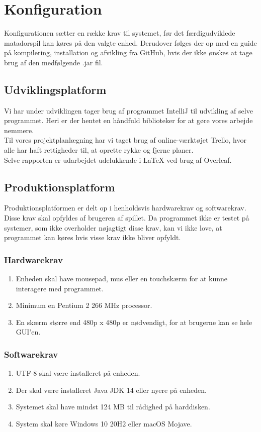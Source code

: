 \section{Konfiguration}
Konfigurationen sætter en række krav til systemet, før det færdigudviklede matadorspil kan køres på den valgte enhed. Derudover følges der op med en guide på kompilering, installation og afvikling fra GitHub, hvis der ikke ønskes at tage brug af den medfølgende .jar fil.

\subsection{Udviklingsplatform}
Vi har under udviklingen tager brug af programmet IntelliJ til udvikling af selve programmet. Heri er der hentet en håndfuld biblioteker for at gøre vores arbejde nemmere.\\
Til vores projektplanlægning har vi taget brug af online-værktøjet Trello, hvor alle har haft rettigheder til, at oprette rykke og fjerne planer.\\
Selve rapporten er udarbejdet udelukkende i LaTeX ved brug af Overleaf.

\subsection{Produktionsplatform}
Produktionsplatformen er delt op i henholdsvis hardwarekrav og softwarekrav. Disse krav skal opfyldes af brugeren af spillet. Da programmet ikke er testet på systemer, som ikke overholder nøjagtigt disse krav, kan vi ikke love, at programmet kan køres hvis visse krav ikke bliver opfyldt.
\subsubsection{Hardwarekrav}
\begin{enumerate}
\item Enheden skal have mousepad, mus eller en touchskærm for at kunne interagere med programmet.
\item Minimum en Pentium 2 266 MHz processor.
\item En skærm større end 480p x 480p er nødvendigt, for at brugerne kan se hele GUI'en.
\end{enumerate}


\subsubsection{Softwarekrav}
\begin{enumerate}
\item UTF-8 skal være installeret på enheden.
\item Der skal være installeret Java JDK 14 eller nyere på enheden.
\item Systemet skal have mindst 124 MB til rådighed på harddisken.
\item System skal køre Windows 10 20H2 eller macOS Mojave.
\end{enumerate}



